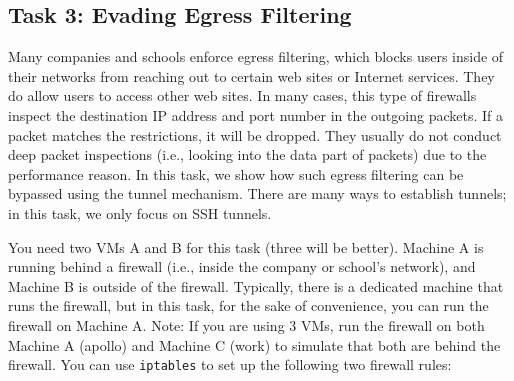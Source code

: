 \subsection{Task 3: Evading Egress Filtering}

Many companies and schools enforce egress filtering, which blocks users
inside of their networks from reaching out to certain web sites or Internet
services. They do allow users to access other web sites. 
In many cases, this type of firewalls inspect 
the destination IP address and port number in the outgoing packets. If 
a packet matches the restrictions, it will be dropped. 
They usually do not conduct deep packet inspections (i.e., looking into
the data part of packets) due to the performance reason. 
In this task, we show how such egress filtering can be bypassed using
the tunnel mechanism. There are many ways to establish tunnels; 
in this task, we only focus on SSH tunnels.

You need two VMs A and B for this task (three will be better). Machine A is running 
behind a firewall (i.e., inside the company or school's network), and Machine B 
is outside of the firewall.
Typically, there is a dedicated machine that runs the firewall, but
in this task, for the sake of convenience, you can run the firewall 
on Machine A. Note: If you are using 3 VMs, run the firewall on both Machine A
(apollo) and Machine C (work) to simulate that both are behind the firewall.
You can use {\tt iptables} to set up the following
two firewall rules:


